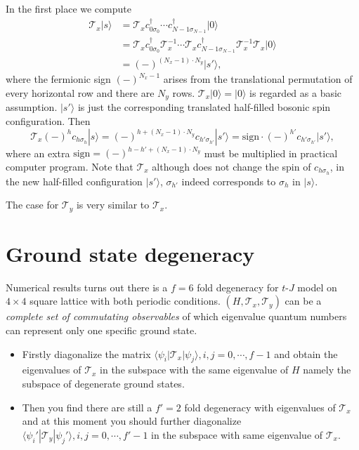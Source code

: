 \documentclass[eprint]{article} %
\begin{document}
In the first place we compute
\begin{equation}
    \begin{aligned}    
    \mathcal{T}_{x}|s\rangle&=\mathcal{T}_{x}c_{0\sigma_{0}}^{\dagger}\cdots{c}_{N-1\sigma_{N-1}}^{\dagger}|0\rangle \\
    &=\mathcal{T}_{x}c_{0\sigma_{0}}^{\dagger}\mathcal{T}_{x}^{-1}\cdots\mathcal{T}_{x}{c}_{N-1\sigma_{N-1}}^{\dagger}\mathcal{T}_{x}^{-1}\mathcal{T}_{x}|0\rangle \\
    &=(-)^{(N_{x}-1)\cdot{N}_{y}}|s{'}\rangle,
    \end{aligned}
    \label{<+label+>}
\end{equation}
where the fermionic sign $(-)^{N_{x}-1}$ arises from the translational permutation of every horizontal row and there are $N_{y}$ rows. $\mathcal{T}_{x}|0\rangle=|0\rangle$ is regarded as a basic assumption. $|s{'}\rangle$ is just the corresponding translated half-filled bosonic spin configuration. Then
\begin{equation}
    \mathcal{T}_{x}(-)^{h}c_{h\sigma_{h}}|s\rangle=(-)^{h+(N_{x}-1)\cdot{N}_{y}}c_{h{'}\sigma_{h{'}}}|s{'}\rangle=\text{sign}\cdot(-)^{h{'}}c_{h{'}\sigma_{h{'}}}|s{'}\rangle,
    \label{<+label+>}
\end{equation}
where an extra $\text{sign}=(-)^{h-h{'}+(N_{x}-1)\cdot{N}_{y}}$ must be multiplied in practical computer program. Note that $\mathcal{T}_{x}$ although does not change the spin of $c_{h\sigma_{h}}$, in the new half-filled configuration $|s{'}\rangle$, $\sigma_{h{'}}$ indeed corresponds to $\sigma_{h}$ in $|s\rangle$.

The case for $\mathcal{T}_{y}$ is very similar to $\mathcal{T}_{x}$.


\section{Ground state degeneracy}
Numerical results turns out there is a $f=6$ fold degeneracy for $t$-$J$ model on $4\times4$ square lattice with both periodic conditions. $(H, \mathcal{T}_{x}, \mathcal{T}_{y})$ can be a \emph{complete set of commutating observables} of which eigenvalue quantum numbers can represent only one specific ground state.
\begin{itemize}
    \item Firstly diagonalize the matrix $\langle\psi_{i}|\mathcal{T}_{x}|\psi_{j}\rangle, i, j=0, \cdots, f-1$ and obtain the eigenvalues of $\mathcal{T}_{x}$ in the subspace with the same eigenvalue of $H$ namely the subspace of degenerate ground states.
    \item Then you find there are still a $f{'}=2$ fold degeneracy with eigenvalues of $\mathcal{T}_{x}$ and at this moment you should further diagonalize $\langle\psi_{i}{'}|\mathcal{T}_{y}|\psi_{j}{'}\rangle, i, j=0, \cdots, f{'}-1$ in the subspace with same eigenvalue of $\mathcal{T}_{x}$.
\end{itemize}

 

\end{document}
